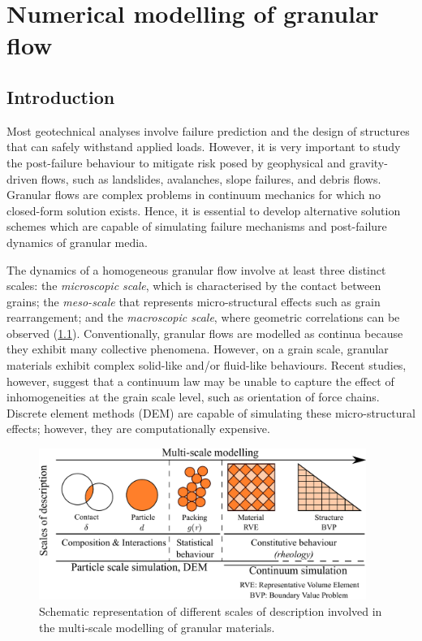 \chapter{Numerical modelling of granular flow}

\ifpdf
    \graphicspath{{Chapter3/figs/raster/}{Chapter3/figs/pdf/}{Chapter3/figs/}}
\else
    \graphicspath{{Chapter3/figs/vector/}{Chapter3/figs/}}
\fi
\label{chapter:numerical_modelling}
\section{Introduction}

Most geotechnical analyses involve failure prediction and the design of 
structures that can safely withstand applied loads. However, it is very 
important to study the post-failure behaviour to mitigate risk posed by 
geophysical and gravity-driven flows, such as landslides, avalanches, slope 
failures, and debris flows. Granular flows are complex problems in continuum 
mechanics for which no closed-form solution exists. Hence, it is essential to 
develop alternative solution schemes which are capable of simulating failure 
mechanisms and post-failure dynamics of granular media. 

The dynamics of a homogeneous granular flow involve at least three distinct 
scales: the \textit{microscopic scale}, which is characterised by the contact 
between grains; the \textit{meso-scale} that represents micro-structural 
effects such as grain rearrangement; and the \textit{macroscopic scale}, where 
geometric correlations can be observed (\cref{fig:multiscale}). Conventionally, 
granular flows are modelled as continua because they exhibit many collective 
phenomena. However, on a grain scale, granular materials exhibit complex 
solid-like and/or fluid-like behaviours. Recent studies, however, suggest that 
a continuum law may be unable to capture the effect of inhomogeneities at the 
grain scale level, such as orientation of force chains. Discrete element 
methods (DEM) are capable of simulating these micro-structural effects; 
however, they are computationally expensive. 

\begin{figure}[tbhp]
\centering
\includegraphics[width=0.95\textwidth]{multiscale}
\caption{Schematic representation of different scales of description involved 
in the multi-scale modelling of granular materials.}
\label{fig:multiscale}
\end{figure}



